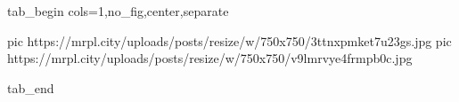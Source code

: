  
 
 
 
 


\ifcmt
  tab_begin cols=1,no_fig,center,separate

     pic https://mrpl.city/uploads/posts/resize/w/750x750/3ttnxpmket7u23gs.jpg
		 pic https://mrpl.city/uploads/posts/resize/w/750x750/v9lmrvye4frmpb0c.jpg

  tab_end
\fi
